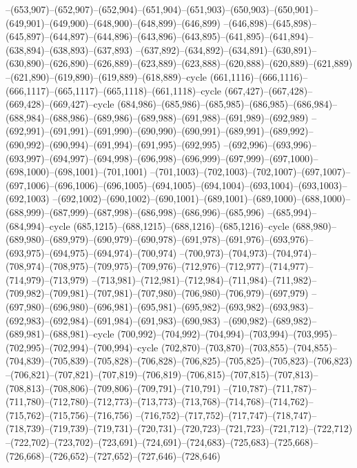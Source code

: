 --(653,907)--(652,907)--(652,904)--(651,904)--(651,903)--(650,903)--(650,901)--(649,901)--(649,900)--(648,900)--(648,899)--(646,899)
--(646,898)--(645,898)--(645,897)--(644,897)--(644,896)--(643,896)--(643,895)--(641,895)--(641,894)--(638,894)--(638,893)--(637,893)
--(637,892)--(634,892)--(634,891)--(630,891)--(630,890)--(626,890)--(626,889)--(623,889)--(623,888)--(620,888)--(620,889)--(621,889)
--(621,890)--(619,890)--(619,889)--(618,889)--cycle
(661,1116)--(666,1116)--(666,1117)--(665,1117)--(665,1118)--(661,1118)--cycle
(667,427)--(667,428)--(669,428)--(669,427)--cycle
(684,986)--(685,986)--(685,985)--(686,985)--(686,984)--(688,984)--(688,986)--(689,986)--(689,988)--(691,988)--(691,989)--(692,989)
--(692,991)--(691,991)--(691,990)--(690,990)--(690,991)--(689,991)--(689,992)--(690,992)--(690,994)--(691,994)--(691,995)--(692,995)
--(692,996)--(693,996)--(693,997)--(694,997)--(694,998)--(696,998)--(696,999)--(697,999)--(697,1000)--(698,1000)--(698,1001)--(701,1001)
--(701,1003)--(702,1003)--(702,1007)--(697,1007)--(697,1006)--(696,1006)--(696,1005)--(694,1005)--(694,1004)--(693,1004)--(693,1003)--(692,1003)
--(692,1002)--(690,1002)--(690,1001)--(689,1001)--(689,1000)--(688,1000)--(688,999)--(687,999)--(687,998)--(686,998)--(686,996)--(685,996)
--(685,994)--(684,994)--cycle
(685,1215)--(688,1215)--(688,1216)--(685,1216)--cycle
(688,980)--(689,980)--(689,979)--(690,979)--(690,978)--(691,978)--(691,976)--(693,976)--(693,975)--(694,975)--(694,974)--(700,974)
--(700,973)--(704,973)--(704,974)--(708,974)--(708,975)--(709,975)--(709,976)--(712,976)--(712,977)--(714,977)--(714,979)--(713,979)
--(713,981)--(712,981)--(712,984)--(711,984)--(711,982)--(709,982)--(709,981)--(707,981)--(707,980)--(706,980)--(706,979)--(697,979)
--(697,980)--(696,980)--(696,981)--(695,981)--(695,982)--(693,982)--(693,983)--(692,983)--(692,984)--(691,984)--(691,983)--(690,983)
--(690,982)--(689,982)--(689,981)--(688,981)--cycle
(700,992)--(704,992)--(704,994)--(703,994)--(703,995)--(702,995)--(702,994)--(700,994)--cycle
(702,870)--(703,870)--(703,855)--(704,855)--(704,839)--(705,839)--(705,828)--(706,828)--(706,825)--(705,825)--(705,823)--(706,823)
--(706,821)--(707,821)--(707,819)--(706,819)--(706,815)--(707,815)--(707,813)--(708,813)--(708,806)--(709,806)--(709,791)--(710,791)
--(710,787)--(711,787)--(711,780)--(712,780)--(712,773)--(713,773)--(713,768)--(714,768)--(714,762)--(715,762)--(715,756)--(716,756)
--(716,752)--(717,752)--(717,747)--(718,747)--(718,739)--(719,739)--(719,731)--(720,731)--(720,723)--(721,723)--(721,712)--(722,712)
--(722,702)--(723,702)--(723,691)--(724,691)--(724,683)--(725,683)--(725,668)--(726,668)--(726,652)--(727,652)--(727,646)--(728,646)
